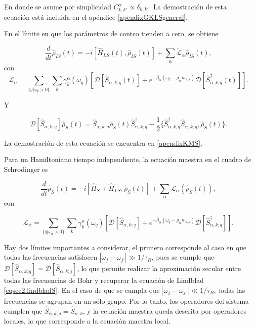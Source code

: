 En donde se asume por simplicidad $C^{\alpha}_{k,k'} \propto \delta_{k,k'}$. La demostración de esta ecuación está incluida en el apéndice \ref{apendixGKLSgeneral}. 

En el límite en que los parámetros de conteo tienden a cero, se obtiene  

\begin{equation*}
    \frac{d}{dt}\hat{\rho}_{IS}(t) = - i[\hat{H}_{LS}(t),\hat{\rho}_{IS}(t)] + \sum_{\alpha}\tilde{\mathcal{L}}_{\alpha} \hat{\rho}_{IS}(t),
\end{equation*}
con
\begin{equation*}
    \tilde{\mathcal{L}}_{\alpha} = \sum_{\{q|\omega_{q}>0\}} \sum_{k}\gamma^{\alpha}_{k}(\omega_{q}) \left[ \mathcal{D}[\hat{S}_{\alpha,k;q}(t)] + e^{-\beta_{\alpha}(\omega_{q} - \mu_{\alpha}n_{\alpha,k})}\mathcal{D}[\hat{S}^{\dagger}_{\alpha,k;q}(t)]  \right].
\end{equation*}

Y 

\begin{equation*}
    \mathcal{D}[\hat{S}_{\alpha,k;q}]\hat{\rho}_{S}(t) = \hat{S}_{\alpha,k;q}\hat{\rho}_{S}(t)\hat{S}^{\dagger}_{\alpha,k;q} - \frac{1}{2}\{\hat{S}^{\dagger}_{\alpha,k;q}\hat{S}_{\alpha,k;q},\hat{\rho}_{S}(t) \}.
\end{equation*}

La demostración de esta ecuación se encuentra en \ref{apendixKMS}.

Para un Hamiltoniano tiempo independiente, la ecuación maestra en el cuadro de Schrodinger es

\begin{equation}
    \frac{d}{dt}\hat{\rho}_{S}(t) = -i [\hat{H}_{S}+ \hat{H}_{LS},\hat{\rho}_{S}(t)] + \sum_{\alpha}\mathcal{L}_{\alpha}(\hat{\rho}_{S}(t)),
\label{sec2schrodingerthermo}
\end{equation}
con

\begin{equation}
    \mathcal{L}_{\alpha} = \sum_{\{q|\omega_{q}>0\}} \sum_{k}\gamma^{\alpha}_{k}(\omega_{q}) \left[ \mathcal{D}[\hat{S}_{\alpha,k;q}] + e^{-\beta_{\alpha}(\omega_{q} - \mu_{\alpha}n_{\alpha,k})}\mathcal{D}[\hat{S}^{\dagger}_{\alpha,k;q}]  \right].
\label{sec2lindbladconsistency}
\end{equation}

Hay dos límites importantes a considerar, el primero corresponde al caso en que todas las frecuencias satisfacen $|\omega_{j}-\omega_{j'}| \gg 1/\tau_{R}$, pues se cumple que $\mathcal{D}[\hat{S}_{\alpha,k;q}] = \mathcal{D}[\hat{S}_{\alpha,k;j}]$, lo que permite realizar la aproximación secular entre todas las frecuencias de Bohr y recuperar la ecuación de Lindblad \ref{eqsec2:lindbladS}. En el caso de que se cumpla que $|\omega_{j}-\omega_{j'}| \ll 1/\tau_{B}$, todas las frecuencias se agrupan en un sólo grupo. Por lo tanto, los operadores del sistema cumplen que $\hat{S}_{\alpha,k;q} = \hat{S}_{\alpha,k}$, y la ecuación maestra queda descrita por operadores locales, lo que corresponde a la ecuación maestra local\cite{wichterich2007modeling}.
